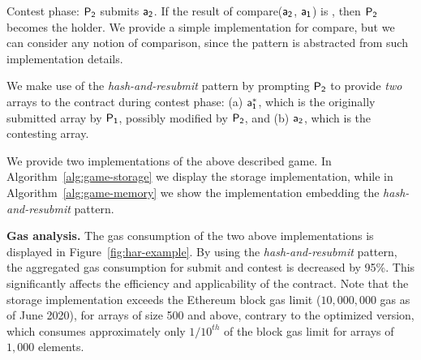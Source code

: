 \noindent \textsf{Contest phase:} $\mathsf{P_2}$ submits $\mathsf{a_2}$. If the result of
\textsf{compare}($\mathsf{a_2}$, $\mathsf{a_1}$) is \true, then $\mathsf{P_2}$ becomes the holder. We
provide a simple implementation for \textsf{compare}, but we can consider any
notion of comparison, since the pattern is abstracted from such implementation
details.

We make use of the \emph{hash-and-resubmit} pattern by prompting $\mathsf{P_2}$ to
provide \emph{two} arrays to the contract during contest phase: (a) $\mathsf{a_1^*}$,
which is the originally submitted array by $\mathsf{P_1}$, possibly modified by $\mathsf{P_2}$,
and (b) $\mathsf{a_2}$, which is the contesting array.

We provide two implementations of the above described game.
In Algorithm~\ref{alg:game-storage} we display the storage implementation,
while in Algorithm~\ref{alg:game-memory} we show the implementation
embedding the \emph{hash-and-resubmit} pattern.



\noindent \textbf{Gas analysis.} The gas consumption of the two above
implementations is displayed in Figure~\ref{fig:har-example}. By using the
\emph{hash-and-resubmit} pattern, the aggregated gas consumption for
\textsf{submit} and \textsf{contest} is decreased by 95\%. This significantly
affects the efficiency and applicability of the contract. Note that the storage
implementation exceeds the Ethereum block gas limit ($10{,}000{,}000$ gas as of
June 2020), for arrays of size 500 and above, contrary to the optimized
version, which consumes approximately only $1/10^{th}$ of the block gas limit
for arrays of $1{,}000$ elements.

